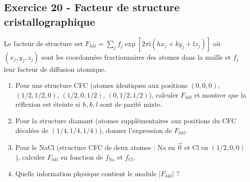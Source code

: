 \documentclass[12pt,a4paper]{article}
\begin{document}
\subsection*{Exercice 20 - Facteur de structure cristallographique \niveau{\difficile}}

\begin{boiteexercice}
Le facteur de structure est $F_{hkl} = \sum_j f_j \exp[2\pi\mathrm{i}(hx_j+ky_j+lz_j)]$ où $(x_j,y_j,z_j)$ sont les coordonnées fractionnaires des atomes dans la maille et $f_j$ leur facteur de diffusion atomique.
\begin{enumerate}
  \item Pour une structure CFC (atomes identiques aux positions $(0,0,0)$, $(1/2,1/2,0)$, $(1/2,0,1/2)$, $(0,1/2,1/2)$), calculer $F_{hkl}$ et montrer que la réflexion est éteinte si $h,k,l$ sont de parité mixte.
  \item Pour la structure diamant (atomes supplémentaires aux positions du CFC décalées de $(1/4,1/4,1/4)$), donner l'expression de $F_{hkl}$.
  \item Pour le NaCl (structure CFC de deux atomes : Na en $\vec{0}$ et Cl en $(1/2,0,0)$), calculer $F_{hkl}$ en fonction de $f_\text{Na}$ et $f_\text{Cl}$.
  \item Quelle information physique contient le module $|F_{hkl}|$ ?
\end{enumerate}
\end{boiteexercice}
\end{document}
